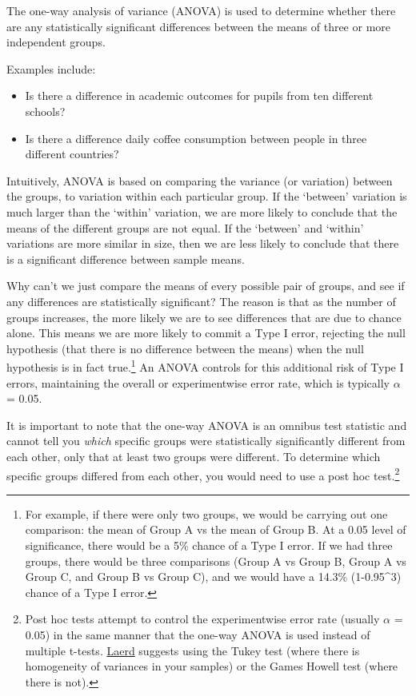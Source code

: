 \documentclass[
  12pt,
]{krantz}
\providecommand{\tightlist}{%
  \setlength{\itemsep}{0pt}\setlength{\parskip}{0pt}}
\begin{document}
The one-way analysis of variance (ANOVA) is used to determine whether there are any statistically significant differences between the means of three or more independent groups.

Examples include:

\begin{itemize}
\tightlist
\item
  Is there a difference in academic outcomes for pupils from ten different schools?
\item
  Is there a difference daily coffee consumption between people in three different countries?
\end{itemize}

Intuitively, ANOVA is based on comparing the variance (or variation) between the groups, to variation
within each particular group. If the `between' variation is much larger than the `within' variation,
we are more likely to conclude that the means of the different groups are not equal. If the `between' and `within' variations are more similar in size, then we are less likely to conclude that there is a significant difference between sample means.

Why can't we just compare the means of every possible pair of groups, and see if any differences are statistically significant? The reason is that as the number of groups increases, the more likely we are to see differences that are due to chance alone. This means we are more likely to commit a Type I error, rejecting the null hypothesis (that there is no difference between the means) when the null hypothesis is in fact true.\footnote{For example, if there were only two groups, we would be carrying out one comparison: the mean of Group A vs the mean of Group B. At a 0.05 level of significance, there would be a 5\% chance of a Type I error. If we had three groups, there would be three comparisons (Group A vs Group B, Group A vs Group C, and Group B vs Group C), and we would have a 14.3\% (1-0.95\^{}3) chance of a Type I error.} An ANOVA controls for this additional risk of Type I errors, maintaining the overall or experimentwise error rate, which is typically \(\alpha\) = 0.05.

It is important to note that the one-way ANOVA is an omnibus test statistic and cannot tell you \emph{which} specific groups were statistically significantly different from each other, only that at least two groups were different. To determine which specific groups differed from each other, you would need to use a post hoc test.\footnote{Post hoc tests attempt to control the experimentwise error rate (usually \(\alpha\) = 0.05) in the same manner that the one-way ANOVA is used instead of multiple t-tests. \href{https://statistics.laerd.com/statistical-guides/one-way-anova-statistical-guide-4.php}{Laerd} suggests using the Tukey test (where there is homogeneity of variances in your samples) or the Games Howell test (where there is not).}
\end{document}
